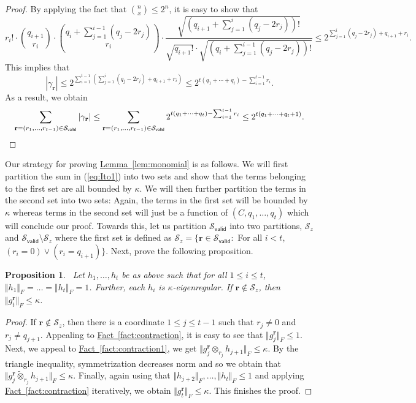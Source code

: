 \documentclass[11pt]{article}
\numberwithin{equation}{section}
\newtheorem{proposition}[theorem]{Proposition}
\theoremstyle{definition}
\theoremstyle{plain}
\newcommand{\expref}[2]{\hyperref[#2]{#1~\ref{#2}}}
\begin{document}
\begin{proof} By applying the fact that $\binom{n}{x} \le 2^n$, it is easy to show that 
\[
r_i! \cdot \binom{q_{i+1}}{r_i} \cdot \binom{q_i+ \sum_{j=1}^{i-1} (q_j - 2 r_j) }{r_i} \cdot \frac{\sqrt{(q_{i+1}+ \sum_{j=1}^{i} (q_j - 2 r_j) )!}}{\sqrt{q_{i+1}!} \cdot \sqrt{(q_i+ \sum_{j=1}^{i-1} (q_j - 2 r_j))!}} \le 2^{\sum_{j=1}^i (q_j - 2 r_j) + q_{i+1} + r_i }. 
\] 
This implies that 
\[
 |\gamma_{\mathbf{r}}|  \le 2^{\sum_{i=1}^{t-1} (\sum_{j=1}^i (q_j - 2 r_j) + q_{i+1} + r_i ) } \le 2^{t(q_1 +\cdots + q_t) - \sum_{i=1}^{t-1} r_{i}}. 
\]
As a result, we obtain 
\[
\sum_{\mathbf{r} =(r_1, \ldots, r_{t-1}) \in \mathcal{S}_{\mathsf{valid}}} |\gamma_{\mathbf{r}}| \le \sum_{\mathbf{r} =(r_1, \ldots, r_{t-1}) \in \mathcal{S}_{\mathsf{valid}}}2^{t(q_1 +\cdots + q_t) - \sum_{i=1}^{t-1} r_{i}} \le 2^{t(q_1 + \cdots + q_t +1)}. \qedhere
\]
\end{proof}
Our strategy for proving \expref{Lemma}{lem:monomial} is as follows. We will first partition the sum in (\ref{eq:Ito1}) into two sets and show that the terms belonging to the first set are all bounded by $\kappa$. We will then further partition the terms in the  second set into two sets: Again, the terms in the first set will be bounded by $\kappa$ whereas terms in the second set will just be a function of $(C, q_1, \ldots, q_t)$ which will conclude our proof. Towards this, let us partition $\mathcal{S}_{\mathsf{valid}}$ into two partitions, $\mathcal{S}_z$ and $\mathcal{S}_{\mathsf{valid}} \setminus \mathcal{S}_z$ where the first set is defined as 
 $\mathcal{S}_z = \{\mathbf{r} \in \mathcal{S}_{\mathsf{valid}}:$ For all $i <t$, $(r_i=0) \vee (r_i = q_{i+1}) \}$.
Next, prove the following proposition. 
\begin{proposition}~\label{prop:approx-error2}
Let $h_1, \ldots, h_t$ be as above such that for all $1 \le i \le t$,  $ \Vert h_1 \Vert_F = \ldots = \Vert h_t \Vert_F=1$. Further, each $h_i$ is $\kappa$-eigenregular. If $\mathbf{r} \not \in \mathcal{S}_z$, then $\Vert g^{\mathbf{r}}_{t} \Vert_F \le \kappa$. 
\end{proposition}
\begin{proof}
If $\mathbf{r} \not \in \mathcal{S}_z$, then there is a coordinate $1 \le j \le t-1$ such that $r_j \neq  0$ and $r_j \neq  q_{j+1}$. Appealing to \expref{Fact}{fact:contraction}, it is easy to see that  $\Vert g^{\mathbf{r}}_{j} \Vert_F \le 1$. Next, we appeal to \expref{Fact}{fact:contraction1}, we get $\Vert g^{\mathbf{r}}_{j} {\otimes}_{r_{j}} h_{j+1} \Vert_F \le \kappa$. By the triangle inequality, symmetrization decreases norm and so we obtain that $\Vert g^{\mathbf{r}}_{j} \widetilde{\otimes}_{r_{j}} h_{j+1} \Vert_F \le \kappa$. Finally, again using that $\Vert h_{j+2} \Vert_F, \ldots, \Vert h_t \Vert_F \le 1$ and applying \expref{Fact}{fact:contraction} iteratively, we obtain $\Vert g^{\mathbf{r}}_{t} \Vert_F \le \kappa$. This finishes the proof.
\end{proof}
\end{document}
